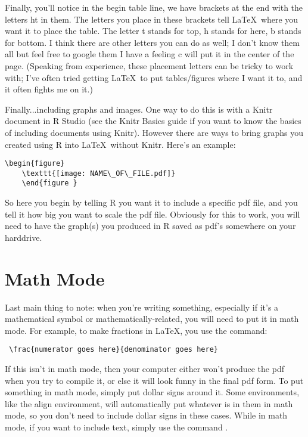 \documentclass{article}
\begin{document}
Finally, you'll notice in the begin table line, we have brackets at the end with the letters ht in them. The letters you place in these brackets tell \LaTeX~where you want it to place the table. The letter t stands for top, h stands for here, b stands for bottom. I think there are other letters you can do as well; I don't know them all but feel free to google them I have a feeling c will put it in the center of the page. (Speaking from experience, these placement letters can be tricky to work with; I've often tried getting \LaTeX~to put tables/figures where I want it to, and it often fights me on it.)

Finally...including graphs and images. One way to do this is with a Knitr document in R Studio (see the Knitr Basics guide if you want to know the basics of including documents using Knitr). However there are ways to bring graphs you created using R into \LaTeX~without Knitr. Here's an example: 

\begin{verbatim}
\begin{figure}
	\texttt{[image: NAME\_OF\_FILE.pdf]}
	\end{figure }
\end{verbatim} 

So here you begin by telling R you want it to include a specific pdf file, and you tell it how big you want to scale the pdf file. Obviously for this to work, you will need to have the graph(s) you produced in R saved as pdf's somewhere on your harddrive.  
 
\section{Math Mode}
Last main thing to note:  when you're writing something, especially if it's a mathematical symbol or mathematically-related, you will need to put it in math mode. For example, to make fractions in \LaTeX, you use the command: \begin{verbatim} \frac{numerator goes here}{denominator goes here} \end{verbatim} If this isn't in math mode, then your computer either won't produce the pdf when you try to compile it, or else it will look funny in the final pdf form. To put something in math mode, simply put dollar signs around it. Some environments, like the align environment, will automatically put whatever is in them in math mode, so you don't need to include dollar signs in these cases. While in math mode, if you want to include text, simply use the command \texttt{\text{}}.
\end{document}
